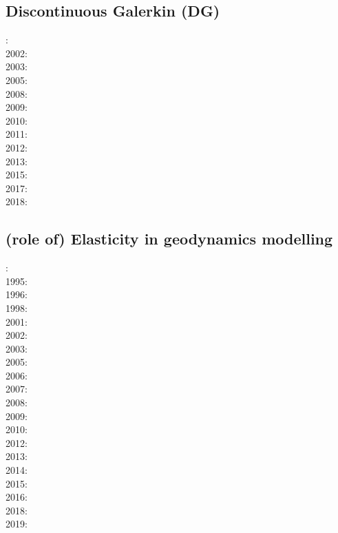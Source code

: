 \subsection{Discontinuous Galerkin (DG)}

{\scriptsize
{}: \cite{coks00}\\
2002: \cite{cacp02}\cite{coks02}\\
2003: \cite{cock03}\\
2005: \cite{cacs05}\cite{coks05}\\
2008: \cite{kans08}\cite{mofh08}\cite{dole08}\\
2009: \cite{coks09}\cite{cogo09}\\
2010: \cite{ngpc10}\cite{conp10}\cite{mofp10}\\
2011: \cite{geor11}\cite{ngpc11}\\
2012: \cite{kauf12}\cite{ngpe12}\cite[chapt. 31]{lomw12}\\
2013: \cite{vyrc13}\\
2015: \cite{lelk15} \\
2017: \cite{fewk17}\cite{iglo17}\cite{hepb17}\\
2018: \cite{puth18}
}

\subsection{(role of) Elasticity in geodynamics modelling}

{\scriptsize
{}:\cite{yusa84}\\
1995:\cite{budi95}\\
1996:\cite{hach96}\\
1998:\cite{copo98}\\
2001:\cite{vapy01}\\
2002:\cite{mumh02}\cite{modm02}\\
2003:\cite{hukm03}\cite{wabu03}\\
2005:\cite{mure05}\\
2006:\cite{kapo06}\cite{mudm06}\\
2007:\cite{kabe07}\\
2008:\cite{baso08}\cite{fukk08}\\
2009:\cite{qurj09}\\
2010:\cite{bepo10}\\
2012:\cite{gerb12}\cite{kasc12}\\
2013:\cite{wahd13}\\
2014:\cite{famc14}\cite{fogm14}\\
2015:\cite{thkp15}\\
2016:\cite{bafl16}\cite{jads16}\cite{olbm16}\cite{bafl16}\\
2018:\cite{dusd18}\\
2019:\cite{pact19}
}

